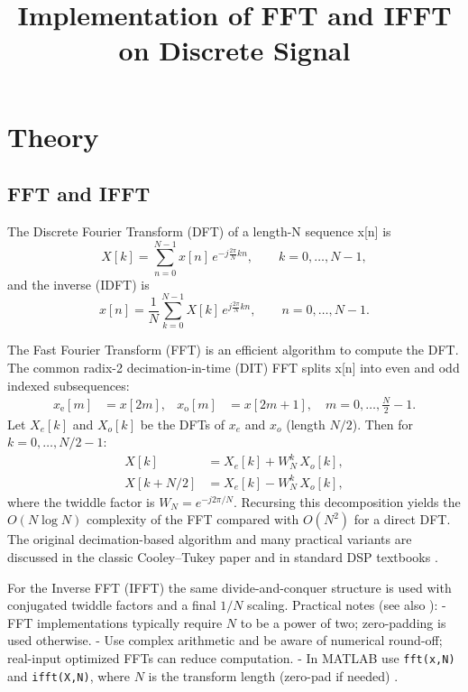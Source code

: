 \documentclass[11pt]{article}
\title{Implementation of FFT and IFFT on Discrete Signal}
\author{}
\date{}
\begin{document}


\pagebreak

\tableofcontents

\pagebreak
{}
\maketitle

\section*{Theory}

\subsection*{FFT and IFFT}
The Discrete Fourier Transform (DFT) of a length-N sequence x[n] is
\begin{equation}
    X[k] = \sum_{n=0}^{N-1} x[n]\,e^{-j\frac{2\pi}{N}kn}, \qquad k=0,\dots,N-1,
\end{equation}
and the inverse (IDFT) is
\begin{equation}
    x[n] = \frac{1}{N}\sum_{k=0}^{N-1} X[k]\,e^{j\frac{2\pi}{N}kn}, \qquad n=0,\dots,N-1.
\end{equation}

The Fast Fourier Transform (FFT) is an efficient algorithm to compute the DFT. The common radix-2 decimation-in-time (DIT) FFT splits x[n] into even and odd indexed subsequences:
\begin{align}
    x_{\text{e}}[m] & = x[2m], & x_{\text{o}}[m] & = x[2m+1], \quad m=0,\dots,\tfrac{N}{2}-1.
\end{align}
Let $X_e[k]$ and $X_o[k]$ be the DFTs of $x_e$ and $x_o$ (length $N/2$). Then for $k=0,\dots,N/2-1$:
\begin{align}
    X[k]     & = X_e[k] + W_N^k\,X_o[k], \\
    X[k+N/2] & = X_e[k] - W_N^k\,X_o[k],
\end{align}
where the twiddle factor is $W_N = e^{-j2\pi/N}$. Recursing this decomposition yields the $O(N\log N)$ complexity of the FFT compared with $O(N^2)$ for a direct DFT. The original decimation-based algorithm and many practical variants are discussed in the classic Cooley–Tukey paper and in standard DSP textbooks \cite{cooley1965algorithm,proakis2007digital,oppenheim2010discrete}.

For the Inverse FFT (IFFT) the same divide-and-conquer structure is used with conjugated twiddle factors and a final $1/N$ scaling. Practical notes (see also \cite{lyons2011understanding,oppenheim2010discrete}):
- FFT implementations typically require $N$ to be a power of two; zero-padding is used otherwise.
- Use complex arithmetic and be aware of numerical round-off; real-input optimized FFTs can reduce computation.
- In MATLAB use \texttt{fft(x,N)} and \texttt{ifft(X,N)}, where $N$ is the transform length (zero-pad if needed) \cite{proakis2007digital}.
\end{document}
